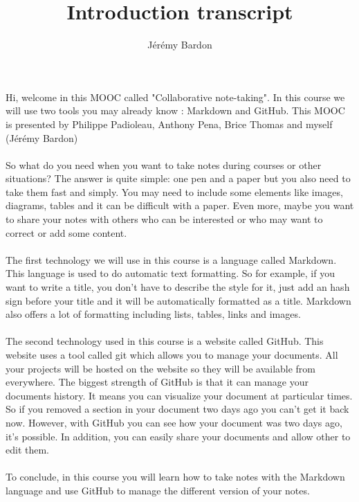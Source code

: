 \documentclass{article}
\title{Introduction transcript}
\author{Jérémy Bardon}
\date{}
\begin{document}
\maketitle

Hi, welcome in this MOOC called "Collaborative note-taking".
In this course we will use two tools you may already know : Markdown and GitHub.
This MOOC is presented by Philippe Padioleau, Anthony Pena, Brice Thomas and myself 
(Jérémy Bardon)
\\\\
So what do you need when you want to take notes during courses or other situations?
The answer is quite simple: one pen and a paper but you also need to take them fast and simply.
You may need to include some elements like images, diagrams, tables and it can be 
difficult with a paper.
Even more, maybe you want to share your notes with others who can be interested or 
who may want to correct or add some content.
\\\\
The first technology we will use in this course is a language called Markdown.
This language is used to do automatic text formatting.
So for example, if you want to write a title, you don't have to describe the 
style for it, just add an hash sign before your title and it will be automatically formatted as a title.
Markdown also offers a lot of formatting including lists, tables, links and images.
\\\\
The second technology used in this course is a website called GitHub.
This website uses a tool called git which allows you to manage your documents.
All your projects will be hosted on the website so they will be available from everywhere.
The biggest strength of GitHub is that it can manage your documents history.
It means you can visualize your document at particular times. So if you removed a section 
in your document two days ago you can't get it back now. However, with GitHub you can see how your document was two days ago, it's possible.
In addition, you can easily share your documents and allow other to edit them.
\\\\
To conclude, in this course you will learn how to take notes with the Markdown language and use GitHub to manage the different version of your notes.
\end{document}
